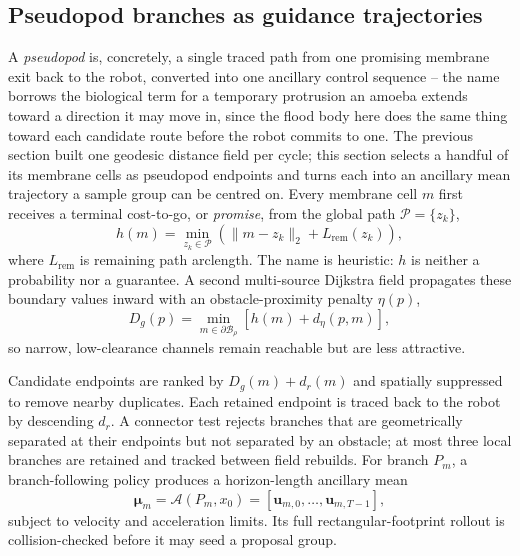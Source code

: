\documentclass[journal]{IEEEtran}
\begin{document}
\subsection{Pseudopod branches as guidance trajectories}
A \emph{pseudopod} is, concretely, a single traced path from one promising
membrane exit back to the robot, converted into one ancillary control
sequence -- the name borrows the biological term for a temporary protrusion
an amoeba extends toward a direction it may move in, since the flood body
here does the same thing toward each candidate route before the robot
commits to one. The previous section built one geodesic distance field per
cycle; this section selects a handful of its membrane cells as pseudopod
endpoints and turns each into an ancillary mean trajectory a sample group can
be centred on. Every membrane cell $m$ first receives a terminal cost-to-go,
or \emph{promise},
from the global path $\mathcal P=\{z_k\}$,
\begin{equation}
 h(m)=\min_{z_k\in\mathcal P}
 \left(\lVert m-z_k\rVert_2+L_{\mathrm{rem}}(z_k)\right),
 \label{eq:promise-short}
\end{equation}
where $L_{\mathrm{rem}}$ is remaining path arclength. The name is heuristic:
$h$ is neither a probability nor a guarantee. A second multi-source Dijkstra
field propagates these boundary values inward with an obstacle-proximity
penalty $\eta(p)$,
\begin{equation}
 D_g(p)=\min_{m\in\partial\mathcal B_\rho}
 \left[h(m)+d_\eta(p,m)\right],
 \label{eq:navigation-short}
\end{equation}
so narrow, low-clearance channels remain reachable but are less attractive.

Candidate endpoints are ranked by $D_g(m)+d_r(m)$ and spatially suppressed to
remove nearby duplicates. Each retained endpoint is traced back to the robot by
descending $d_r$. A connector test rejects branches that are geometrically
separated at their endpoints but not separated by an obstacle; at most three
local branches are retained and tracked between field rebuilds. For branch
$P_m$, a branch-following policy produces a horizon-length ancillary mean
\begin{equation}
 \boldsymbol\mu_m=\mathcal A(P_m,x_0)
   =[\mathbf u_{m,0},\ldots,\mathbf u_{m,T-1}],
 \label{eq:ancillary-short}
\end{equation}
subject to velocity and acceleration limits. Its full rectangular-footprint
rollout is collision-checked before it may seed a proposal group.
\end{document}
